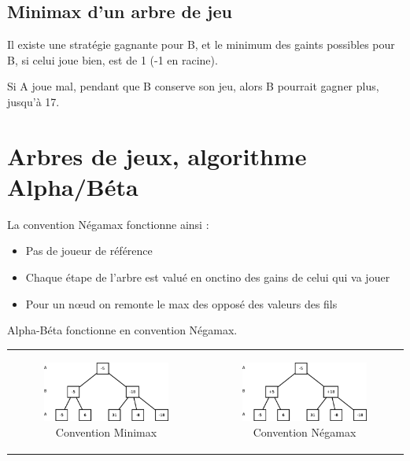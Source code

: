 \documentclass[12pt,a4paper,openany]{book}
\begin{document}
	\section{Minimax d'un arbre de jeu}
	Il existe une stratégie gagnante pour B, et le minimum
	des gaints possibles pour B, si celui joue bien, est de 1
	(-1 en racine).

	Si A joue mal, pendant que B conserve son jeu, alors B
	pourrait gagner plus, jusqu'à 17.
	\chapter{Arbres de jeux, algorithme Alpha/Béta}
	La convention Négamax fonctionne ainsi : 
	\begin{itemize}
		\item Pas de joueur de référence
		\item Chaque étape de l'arbre est valué en onctino des gains de celui qui va jouer
		\item Pour un nœud on remonte le max des opposé des valeurs des fils
	\end{itemize}

	Alpha-Béta fonctionne en convention Négamax.

	\begin{tabular}{cc}
		\begin{minipage}{0.5\textwidth}
	\begin{figure}[H]
		\includegraphics[width=8cm]{Diagramme11.eps}
		\caption{Convention Minimax}
	\end{figure}
\end{minipage}
	&
		\begin{minipage}{0.5\textwidth}
	\begin{figure}[H]
		\includegraphics[width=8cm]{Diagramme12.eps}
		\caption{Convention Négamax}
	\end{figure}
\end{minipage}
\end{tabular}
\end{document}
